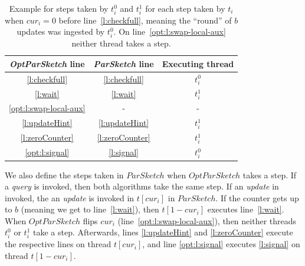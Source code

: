 \begin{table}[H]
    \begin{tabular}{c|c|c}
        \emph{OptParSketch} line & \emph{ParSketch} line & Executing thread\\[5pt]
        \hline
        \ref{l:checkfull} & \ref{l:checkfull} & $t_i^0$\\[5pt]
        \ref{l:wait} & \ref{l:wait}& $t_i^1$\\[5pt]
        \ref{opt:l:swap-local-aux} & - & - \\[5pt]
        \ref{l:updateHint} & \ref{l:updateHint} & $t_i^1$\\[5pt]
        \ref{l:zeroCounter} & \ref{l:zeroCounter} & $t_i^1$\\[5pt]
        \ref{opt:l:signal} & \ref{l:signal} & $t_i^0$ 
    \end{tabular}
    \caption{Example for steps taken by $t_i^0$ and $t_i^1$ for each step taken by $t_i$ when $cur_i=0$ before line~\ref{l:checkfull},
    meaning the ``round'' of $b$ updates was ingested by $t_i^0$. On line~\ref{opt:l:swap-local-aux} neither thread takes a step.}
    \label{table:opt-simulation}
\end{table}

We also define the steps taken in $ParSketch$ when $OptParSketch$ takes a step. If a \emph{query} is invoked,
then both algorithms take the same step. If an \emph{update} in invoked, the an \emph{update} is invoked in
$t[cur_i]$ in $ParSketch$. If the counter gets up to $b$ (meaning we get to line~\ref{l:wait}), then
$t[1-cur_i]$ executes line~\ref{l:wait}. When $OptParSketch$ flips $cur_i$ (line~\ref{opt:l:swap-local-aux}),
then neither threads $t_i^0$ or $t_i^1$ take a step. Afterwards, lines \ref{l:updateHint} and \ref{l:zeroCounter}
execute the respective lines on thread $t[cur_i]$, and line \ref{opt:l:signal} executes \ref{l:signal} on thread $t[1-cur_i]$.

